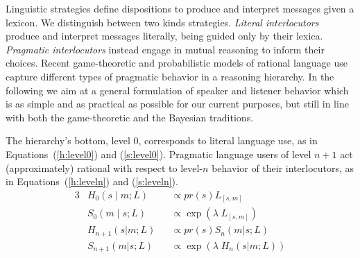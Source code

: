 \documentclass[a4paper, 11pt]{article}
\theoremstyle{Satz}
\begin{document}
Linguistic strategies define dispositions to produce and interpret messages given a lexicon. We
distinguish between two kinds strategies. {\em Literal interlocutors} produce and interpret
messages literally, being guided only by their lexica. {\em Pragmatic interlocutors} instead
engage in mutual reasoning to inform their choices. Recent game-theoretic
\citep[e.g.,][]{benz:2006,benz+vRooij:2007,jaeger:2007b,franke+jaeger:2014} and probabilistic
models of rational language use
\citep[e.g.,][]{frank+goodman:2012,FrankeJager2015:Probabilistic-p,GoodmanFrank2016:Pragmatic-Langu}
capture different types of pragmatic behavior in a reasoning hierarchy. In the following we aim
at a general formulation of speaker and listener behavior which is as simple and as practical
as possible for our current purposes, but
still in line with both the game-theoretic and the Bayesian traditions.

The hierarchy's bottom, level $0$, corresponds to literal language use, as in
Equations~(\ref{h:level0}) and (\ref{s:level0}). Pragmatic language users of level $n + 1$ act
(approximately) rational with respect to level-$n$ behavior of their interlocutors, as in
Equations~(\ref{h:leveln}) and (\ref{s:leveln}).
\begin{alignat}{3}
&H_{0}(s \mid m;L) &&\propto pr(s) L_{[s,m]} \label{h:level0}\\
&S_{0}(m \mid s;L) &&\propto \exp(\lambda \; L_{[s,m]}) \label{s:level0}\\
&H_{n+1}(s|m;L) &&\propto pr(s) S_{n}(m|s;L) \label{h:leveln}\\
&S_{n+1}(m|s;L) &&\propto  \exp(\lambda \; H_{n}(s|m;L)) \label{s:leveln}
\end{alignat}
\end{document}
